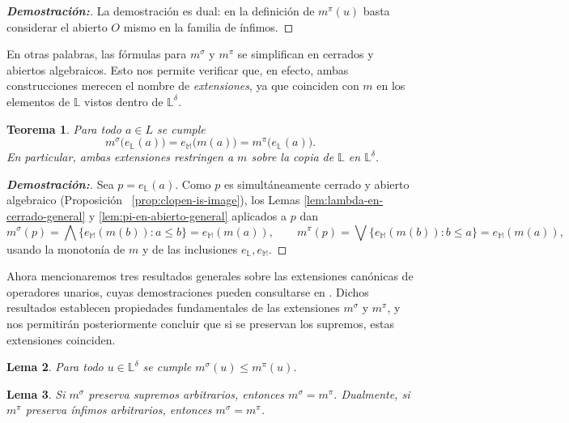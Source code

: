 \documentclass[12pt]{book}
\newtheorem{theorem}{Teorema}[section]
\newtheorem{lemma}[theorem]{Lema}
\begin{document}
\begin{proof}[\textbf{Demostración:}]
La demostración es dual: en la definición de $m^\pi(u)$ basta considerar el abierto $O$ mismo en la familia de ínfimos.
\end{proof}
En otras palabras, las fórmulas para $m^\sigma$ y $m^\pi$ se simplifican en cerrados y abiertos algebraicos. Esto nos permite verificar que, en efecto, ambas construcciones merecen el nombre de \emph{extensiones}, ya que coinciden con $m$ en los elementos de $\mathbb L$ vistos dentro de $\mathbb L^\delta$.
\begin{theorem}\label{thm:extension-respects-original-general}
Para todo $a\in L$ se cumple
\[
  m^{\sigma}\bigl(e_\mathbb{L}(a)\bigr)
  = e_\mathbb{M}\bigl(m(a)\bigr)
  = m^{\pi}\bigl(e_\mathbb{L}(a)\bigr).
\]
En particular, ambas extensiones restringen a $m$ sobre la copia de $\mathbb{L}$ en $\mathbb{L}^\delta$.
\end{theorem}

\begin{proof}[\textbf{Demostración:}]
Sea $p=e_\mathbb{L}(a)$. Como $p$ es simultáneamente cerrado y abierto algebraico (Proposición ~\ref{prop:clopen-is-image}),
los Lemas \ref{lem:lambda-en-cerrado-general} y \ref{lem:pi-en-abierto-general} aplicados a $p$ dan
\[
m^\sigma(p)
  =\bigwedge\{e_\mathbb{M}(m(b)):a\le b\}
  =e_\mathbb{M}(m(a)),
\qquad
m^\pi(p)
  =\bigvee\{e_\mathbb{M}(m(b)):b\le a\}
  =e_\mathbb{M}(m(a)),
\]
usando la monotonía de $m$ y de las inclusiones $e_\mathbb{L},e_\mathbb{M}$.
\end{proof}

Ahora mencionaremos tres resultados generales sobre las extensiones canónicas de operadores unarios, cuyas demostraciones pueden consultarse en \cite[pp.~349–352]{GehrkeHarding2001}.
Dichos resultados establecen propiedades fundamentales de las extensiones
$m^{\sigma}$ y $m^{\pi}$, y nos permitirán posteriormente concluir que si se preservan los supremos, estas extensiones coinciden.


\begin{lemma}\label{lem:sigma-leq-pi}\cite[Lema~4.2]{GehrkeHarding2001}
Para todo $u\in\mathbb{L}^\delta$ se cumple $m^{\sigma}(u)\le m^{\pi}(u)$.
\end{lemma}

\begin{lemma}\label{lem:igualdad-por-preservacion}\cite[Lema~4.4]{GehrkeHarding2001}
Si $m^{\sigma}$ preserva supremos arbitrarios, entonces $m^{\sigma}=m^{\pi}$.
Dualmente, si $m^{\pi}$ preserva ínfimos arbitrarios, entonces $m^{\sigma}=m^{\pi}$.
\end{lemma}
\end{document}
